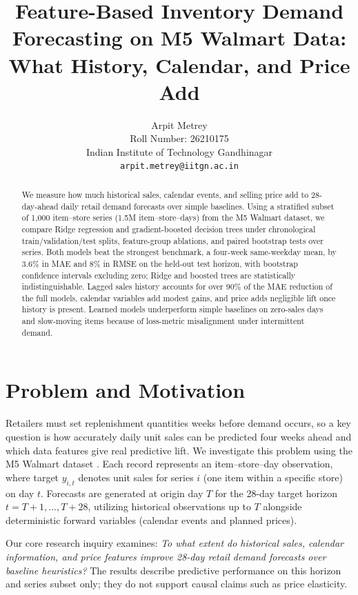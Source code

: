 \documentclass{article}
\title{Feature-Based Inventory Demand Forecasting on M5 Walmart Data: What History, Calendar, and Price Add}
\author{Arpit Metrey \\ Roll Number: 26210175 \\ Indian Institute of Technology Gandhinagar \\ \texttt{arpit.metrey@iitgn.ac.in}}
\begin{document}
\maketitle

\begin{abstract}
We measure how much historical sales, calendar events, and selling price add to 28-day-ahead daily retail demand forecasts over simple baselines. Using a stratified subset of 1,000 item--store series (1.5M item--store--days) from the M5 Walmart dataset, we compare Ridge regression and gradient-boosted decision trees under chronological train/validation/test splits, feature-group ablations, and paired bootstrap tests over series. Both models beat the strongest benchmark, a four-week same-weekday mean, by 3.6\% in MAE and 8\% in RMSE on the held-out test horizon, with bootstrap confidence intervals excluding zero; Ridge and boosted trees are statistically indistinguishable. Lagged sales history accounts for over 90\% of the MAE reduction of the full models, calendar variables add modest gains, and price adds negligible lift once history is present. Learned models underperform simple baselines on zero-sales days and slow-moving items because of loss-metric misalignment under intermittent demand.
\end{abstract}

\section{Problem and Motivation}
Retailers must set replenishment quantities weeks before demand occurs, so a key question is how accurately daily unit sales can be predicted four weeks ahead and which data features give real predictive lift. We investigate this problem using the M5 Walmart dataset \citep{makridakis2022}. Each record represents an item--store--day observation, where target $y_{i,t}$ denotes unit sales for series $i$ (one item within a specific store) on day $t$. Forecasts are generated at origin day $T$ for the 28-day target horizon $t=T+1,\dots,T+28$, utilizing historical observations up to $T$ alongside deterministic forward variables (calendar events and planned prices).

Our core research inquiry examines: \emph{To what extent do historical sales, calendar information, and price features improve 28-day retail demand forecasts over baseline heuristics?} The results describe predictive performance on this horizon and series subset only; they do not support causal claims such as price elasticity.
\end{document}
